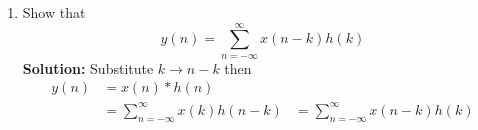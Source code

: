 \documentclass[journal,12pt,twocolumn]{IEEEtran}
\newcommand{\solution}{\noindent \textbf{Solution: }}
\numberwithin{equation}{section}
\renewcommand\thesection{\arabic{section}}
\begin{document}
\begin{enumerate}[label=\thesection.\arabic*]
\begin{align}
{  0.9375  \\ -0.390625 \\ 0.3125   \\ 0.     \\	   0.078125}
\end{align}
And this is what we got in \eqref{eq:convolution}
\item Show that
\begin{equation}
y(n) =  \sum_{n=-\infty}^{\infty}x(n-k)h(k)
\end{equation}
\solution Substitute $k\to n-k$ then \begin{align}
y(n) &=  x(n)*h(n)\\
&=\sum_{n=-\infty}^{\infty}x(k)h(n-k)
&= \sum_{n=-\infty}^{\infty}x(n-k)h(k)
\end{align}
\end{enumerate}

%
\end{document}
